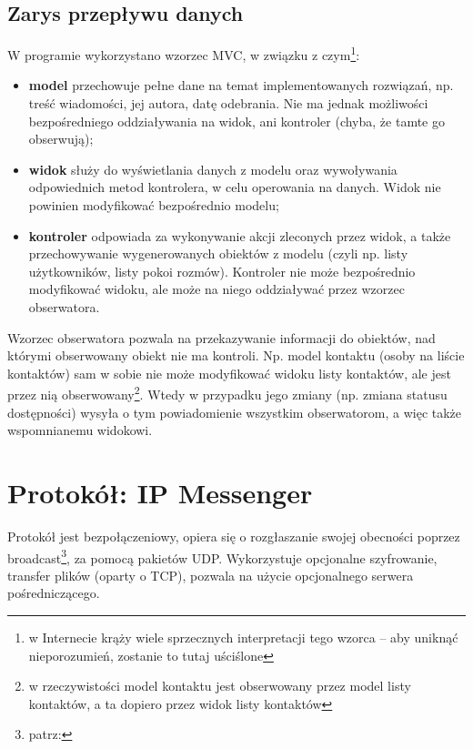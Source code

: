 \documentclass[11pt,leqno]{article}
\begin{document}
\subsection{Zarys przepływu danych}

W programie wykorzystano wzorzec MVC, w związku z czym\footnote{w Internecie krąży wiele
sprzecznych interpretacji tego wzorca -- aby uniknąć nieporozumień, zostanie to tutaj uściślone}:
\begin{itemize}
	\item \textbf{model} przechowuje pełne dane na temat implementowanych rozwiązań, np. treść
	wiadomości, jej autora, datę odebrania. Nie ma jednak możliwości bezpośredniego oddziaływania
	na widok, ani kontroler (chyba, że tamte go obserwują);
	\item \textbf{widok} służy do wyświetlania danych z modelu oraz wywoływania odpowiednich metod
	kontrolera, w celu operowania na danych. Widok nie powinien modyfikować bezpośrednio modelu;
	\item \textbf{kontroler} odpowiada za wykonywanie akcji zleconych przez widok, a także
	przechowywanie wygenerowanych obiektów z modelu (czyli np. listy użytkowników, listy pokoi
	rozmów). Kontroler nie może bezpośrednio modyfikować widoku, ale może na niego oddziaływać
	przez wzorzec obserwatora.
\end{itemize}

Wzorzec obserwatora pozwala na przekazywanie informacji do obiektów, nad którymi obserwowany
obiekt nie ma kontroli. Np. model kontaktu (osoby na liście kontaktów) sam w sobie nie może
modyfikować widoku listy kontaktów, ale jest przez nią obserwowany\footnote{w rzeczywistości model kontaktu
jest obserwowany przez model listy kontaktów, a ta dopiero przez widok listy kontaktów}. Wtedy
w przypadku jego zmiany (np. zmiana statusu dostępności) wysyła o tym powiadomienie wszystkim
obserwatorom, a więc także wspomnianemu widokowi.


\section{Protokół: IP Messenger}

Protokół jest bezpołączeniowy, opiera się o rozgłaszanie swojej obecności poprzez
broadcast\footnote{patrz: }, za pomocą pakietów UDP. Wykorzystuje
opcjonalne szyfrowanie, transfer plików (oparty o TCP), pozwala na użycie opcjonalnego serwera
pośredniczącego.
\end{document}
